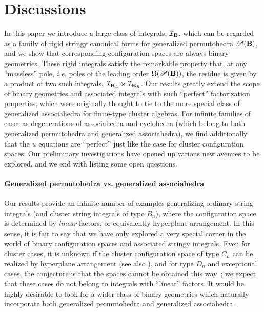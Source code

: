 \documentclass[hidelinks,12pt]{article}
\begin{document}
\section{Discussions}

In this paper we introduce a large class of integrals,  ${\cal I}_{\bf B}$, which can be regarded as a family of rigid stringy canonical forms%
for generalized permutohedra ${\mathscr P}(\bf B)$, and we show that corresponding configuration spaces are always binary geometries. These rigid integrals satisfy the remarkable property that, at any ``massless'' pole, {\it i.e.} poles of the leading order $\Omega({\mathscr P}(\bf B) )$, the residue is given by a product of two such integrals, ${\cal I}_{{\bf B}_L} \times {\cal I}_{{\bf B}_R}$. Our results greatly extend the scope of binary geometries and associated integrals with such ``perfect'' factorization properties, which were originally thought to tie to the more special class of generalized associahedra for finite-type cluster algebras. For infinite families of cases as degenerations of associahedra and cyclohedra (which belong to both generalized permutohedra and generalized associahedra), we find additionally that the $u$ equations are ``perfect'' just like the case for cluster configuration spaces. Our preliminary investigations have opened up various new avenues to be explored, and we end with listing some open questions.

\paragraph{Generalized permutohedra vs. generalized associahedra} Our results provide an infinite number of examples generalizing ordinary string integrals (and cluster string integrals of type $B_n$), where the configuration space is determined by {\it linear} factors, or equivalently hyperplane arrangement. In this sense, it is fair to say that we have only explored a very special corner in the world of binary configuration spaces and associated stringy integrals. Even for cluster cases, it is unknown if the cluster configuration space of type $C_n$ can be realized by hyperplane arrangement (see also \cite{Li:2018mnq}), and for type $ D_n$ and exceptional cases, the conjecture is that the spaces cannot be obtained this way~\cite{Arkani-Hamed:2019plo}; we expect that these cases do not belong to integrals with ``linear'' factors. It would be highly desirable to look for a wider class of binary geometries which naturally incorporate both generalized permutohedra and generalized associahedra. 
\end{document}
